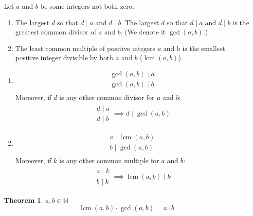 \documentclass[letterpaper, 12pt]{article}
\newtheorem{theorem}{Theorem}[section]
\newenvironment{definition}[1][Definition]{\begin{trivlist}
\item[\hskip \labelsep {\bfseries #1}]}{\end{trivlist}}
\DeclareMathOperator{\lcm}{lcm}
\newcommand{\N}{\mathbb{N}}
\newcommand{\0}{\emptyset}
\begin{document}
    \begin{definition}
        Let $a$ and $b$ be some integers not both zero.
        \begin{enumerate}
            \item The largest $d$ so that $d \mid a$ and $d \mid b$. The largest $d$ so that 
            $d \mid a$ and $d \mid b$ is the greatest common divisor of $a$ and $b$. 
            (We denote it $\gcd(a, b)$.)
            \item The least common multiple of positive integers $a$ and b is the smallest 
            positive integer divisible by both $a$ and $b$ ($\lcm(a, b)$).
        \end{enumerate}
        \begin{enumerate}
            \item \begin{gather*}
                \gcd(a, b) \mid a \\
                \gcd(a, b) \mid b \\
            \end{gather*}
            Moreover, if $d$ is any other common divisor for $a$ and $b$:
            \begin{gather*}
                \begin{aligned}
                    d \mid a \\
                    d \mid b
                \end{aligned}
                \implies d \mid \gcd(a, b)
            \end{gather*}
            \item \begin{gather*}
                a \mid \lcm(a, b) \\
                b \mid \gcd(a, b) \\
            \end{gather*}
            Moreover, if $k$ is any other common multiple for $a$ and $b$:
            \begin{gather*}
                \begin{aligned}
                    a \mid k \\
                    b \mid k
                \end{aligned}
                \implies \lcm(a, b) \mid k
            \end{gather*}
        \end{enumerate}
    \end{definition}
    \begin{theorem}
        $a, b \in \N$
        \[\lcm(a, b) \cdot \gcd(a, b) = a \cdot b\]
    \end{theorem}
\end{document}
